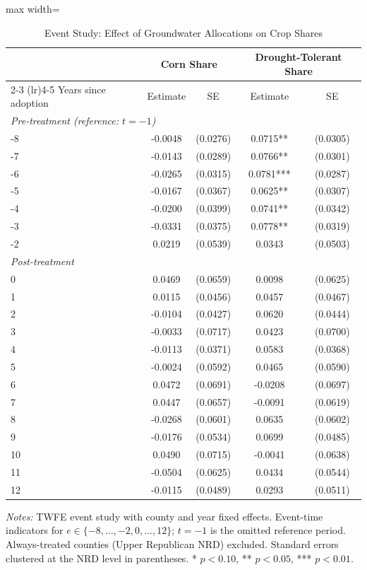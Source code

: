 \begin{table}[H]
\centering
\caption{Event Study: Effect of Groundwater Allocations on Crop Shares}
\label{tab:eventstudy}
\begin{threeparttable}
\begin{adjustbox}{max width=\textwidth}
\begin{tabular}{lcccc}
\toprule
 & \multicolumn{2}{c}{Corn Share} & \multicolumn{2}{c}{Drought-Tolerant Share} \\
\cmidrule(lr){2-3} \cmidrule(lr){4-5}
Years since adoption & Estimate & SE & Estimate & SE \\
\midrule
\multicolumn{5}{l}{\textit{Pre-treatment (reference: $t = -1$)}} \\
-8 & -0.0048 & (0.0276) & 0.0715** & (0.0305) \\
-7 & -0.0143 & (0.0289) & 0.0766** & (0.0301) \\
-6 & -0.0265 & (0.0315) & 0.0781*** & (0.0287) \\
-5 & -0.0167 & (0.0367) & 0.0625** & (0.0307) \\
-4 & -0.0200 & (0.0399) & 0.0741** & (0.0342) \\
-3 & -0.0331 & (0.0375) & 0.0778** & (0.0319) \\
-2 & 0.0219 & (0.0539) & 0.0343 & (0.0503) \\
\midrule
\multicolumn{5}{l}{\textit{Post-treatment}} \\
0 & 0.0469 & (0.0659) & 0.0098 & (0.0625) \\
1 & 0.0115 & (0.0456) & 0.0457 & (0.0467) \\
2 & -0.0104 & (0.0427) & 0.0620 & (0.0444) \\
3 & -0.0033 & (0.0717) & 0.0423 & (0.0700) \\
4 & -0.0113 & (0.0371) & 0.0583 & (0.0368) \\
5 & -0.0024 & (0.0592) & 0.0465 & (0.0590) \\
6 & 0.0472 & (0.0691) & -0.0208 & (0.0697) \\
7 & 0.0447 & (0.0657) & -0.0091 & (0.0619) \\
8 & -0.0268 & (0.0601) & 0.0635 & (0.0602) \\
9 & -0.0176 & (0.0534) & 0.0699 & (0.0485) \\
10 & 0.0490 & (0.0715) & -0.0041 & (0.0638) \\
11 & -0.0504 & (0.0625) & 0.0434 & (0.0544) \\
12 & -0.0115 & (0.0489) & 0.0293 & (0.0511) \\
\bottomrule
\end{tabular}
\end{adjustbox}
\begin{tablenotes}[flushleft]
\small
\item \textit{Notes:} TWFE event study with county and year fixed effects. Event-time indicators for $e \in \{-8, \ldots, -2, 0, \ldots, 12\}$; $t = -1$ is the omitted reference period. Always-treated counties (Upper Republican NRD) excluded. Standard errors clustered at the NRD level in parentheses. * $p<0.10$, ** $p<0.05$, *** $p<0.01$.
\end{tablenotes}
\end{threeparttable}
\end{table}
